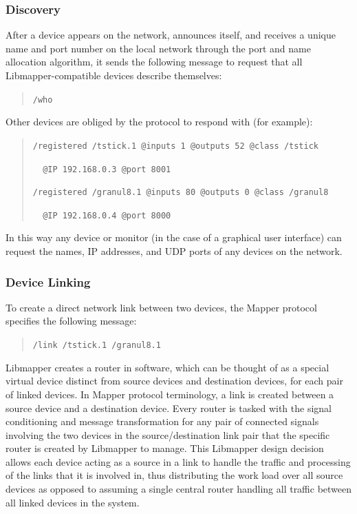 \subsubsection{Discovery}

After a device appears on the network, announces itself, and receives a unique name and port number on the local network through the port and name allocation algorithm, it sends the following message to request that all Libmapper-compatible devices describe themselves:

\begin{quote}
\verb#/who#
\end{quote}

Other devices are obliged by the protocol to respond with (for example):

\begin{quote}
\verb#/registered /tstick.1 @inputs 1 @outputs 52 @class /tstick# 

\verb#  @IP 192.168.0.3 @port 8001#

\verb#/registered /granul8.1 @inputs 80 @outputs 0 @class /granul8#

\verb#  @IP 192.168.0.4 @port 8000#
\end{quote}

In this way any device or monitor (in the case of a graphical user interface) can request the names, IP addresses, and UDP ports of any devices on the network. 

\subsubsection{Device Linking}

To create a direct network link between two devices, the Mapper protocol specifies the following message:

\begin{quote}
\verb#/link /tstick.1 /granul8.1#
\end{quote}

Libmapper creates a router in software, which can be thought of as a special virtual device distinct from source devices and destination devices, for each pair of linked devices. In Mapper protocol terminology, a link is created between a source device and a destination device. Every router is tasked with the signal conditioning and message transformation for any pair of connected signals involving the two devices in the source/destination link pair that the specific router is created by Libmapper to manage. This Libmapper design decision allows each device acting as a source in a link to handle the traffic and processing of the links that it is involved in, thus distributing the work load over all source devices as opposed to assuming a single central router handling all traffic between all linked devices in the system.

